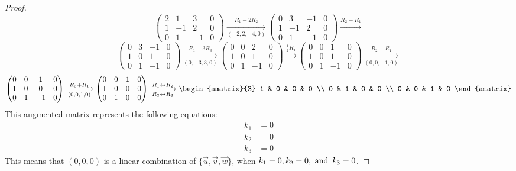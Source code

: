 \begin{enumerate}
\begin{proof}
\[      \begin{pmatrix}
        2 & 1  & 3  & 0 \\
        1 & -1 & 2  & 0 \\
        0 & 1  & -1 & 0
      \end{pmatrix} \xrightarrow[(-2,2,-4,0)]{R_1 - 2R_2}
      \begin{pmatrix}
        0 & 3  & -1 & 0 \\
        1 & -1 & 2  & 0 \\
        0 & 1  & -1 & 0
      \end{pmatrix} \xrightarrow{R_2 + R_1}
    \]
    \[
      \begin{pmatrix}
        0 & 3 & -1 & 0 \\
        1 & 0 & 1  & 0 \\
        0 & 1 & -1 & 0
      \end{pmatrix} \xrightarrow[(0,-3,3,0)]{R_1 - 3R_3}
      \begin{pmatrix}
        0 & 0 & 2  & 0 \\
        1 & 0 & 1  & 0 \\
        0 & 1 & -1 & 0
      \end{pmatrix} \xrightarrow{\frac{1}{2}R_1}
      \begin{pmatrix}
        0 & 0 & 1  & 0 \\
        1 & 0 & 1  & 0 \\
        0 & 1 & -1 & 0
      \end{pmatrix} \xrightarrow[(0,0,-1,0)]{R_2 - R_1}
    \]
    \[
      \begin{pmatrix}
        0 & 0 & 1  & 0 \\
        1 & 0 & 0  & 0 \\
        0 & 1 & -1 & 0
      \end{pmatrix} \xrightarrow[(0,0,1,0)]{R_3 + R_1}
      \begin{pmatrix}
        0 & 0 & 1 & 0 \\
        1 & 0 & 0 & 0 \\
        0 & 1 & 0 & 0
      \end{pmatrix} \xrightarrow[R_2 \leftrightarrow R_3]{R_1 \leftrightarrow R_2}
      \begin{amatrix}{3}
        1 & 0 & 0 & 0 \\
        0 & 1 & 0 & 0 \\
        0 & 0 & 1 & 0
      \end{amatrix}
    \]
    This augmented matrix represents the following equations:
    \begin{align*}
      k_1 & = 0 \\
      k_2 & = 0 \\
      k_3 & = 0
    \end{align*}
    This means that $(0,0,0)$ is a linear combination of $\{\vec{u},\vec{v},\vec{w}\}$, when $k_1 = 0, k_2 = 0, \operatorname{~\text{and}~} k_3 = 0$.
  \end{proof}
\end{enumerate}

